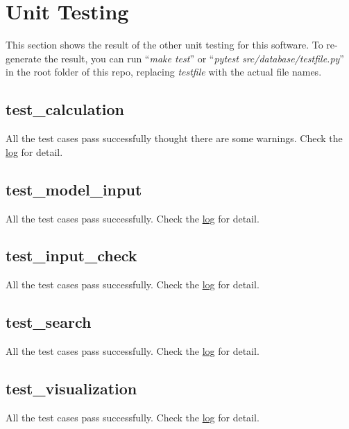 \documentclass[12pt, titlepage]{article}
\begin{document}
\section{Unit Testing}\label{UT}
This section shows the result of the other unit testing for this software. To re-generate the result, you can run ``\textit{make test}'' or ``\textit{pytest src/database/testfile.py}'' in the root folder of this repo, replacing \textit{testfile} with the actual file names. 

\subsection{test\_calculation}
All the test cases pass successfully thought there are some warnings. Check the \href{https://github.com/CynthiaLiu0805/BridgeCorrosion/blob/main/tests/test\_calculation.log}{log} for detail.


\subsection{test\_model\_input}
All the test cases pass successfully. Check the \href{https://github.com/CynthiaLiu0805/BridgeCorrosion/blob/main/tests/test\_model\_input.log}{log} for detail.


\subsection{test\_input\_check}
All the test cases pass successfully. Check the \href{https://github.com/CynthiaLiu0805/BridgeCorrosion/blob/main/tests/test\_input\_check.log}{log} for detail.

\subsection{test\_search}
All the test cases pass successfully. Check the \href{https://github.com/CynthiaLiu0805/BridgeCorrosion/blob/main/tests/test\_search.log}{log} for detail.
\subsection{test\_visualization}
All the test cases pass successfully. Check the \href{https://github.com/CynthiaLiu0805/BridgeCorrosion/blob/main/tests/test\_visualization.log}{log} for detail.
\end{document}
